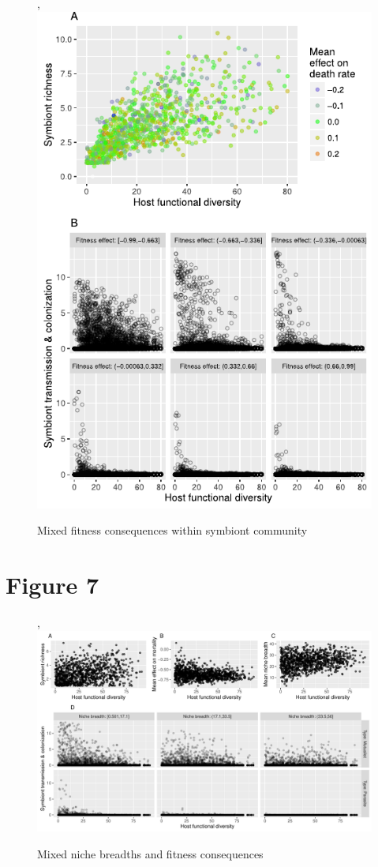\documentclass[12pt]{article}
\begin{document}
\begin{figure}[ht]\centering,
\includegraphics[width=\linewidth]{fig/fig5.pdf}
\caption{Mixed fitness consequences within symbiont community}
\label{f6}
\end{figure}

\newpage

\section*{Figure 7}

\begin{figure}[ht]\centering,
\includegraphics[width=\linewidth]{fig/fig6.pdf}
\caption{Mixed niche breadths and fitness consequences}
\label{f7}
\end{figure}
\end{document}
